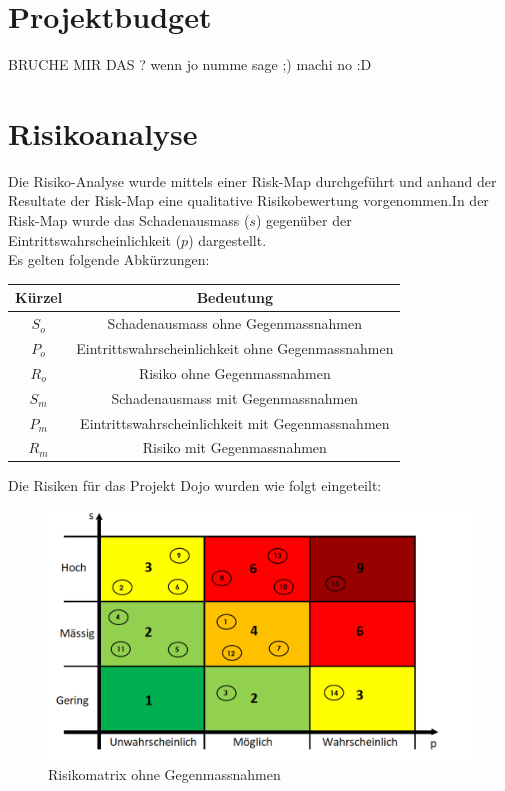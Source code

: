 \documentclass[10pt,a4paper,oneside]{99_fhnwreport}
\begin{document}
\section{Projektbudget}\label{sec:projektbudget}
BRUCHE MIR DAS ?
wenn jo numme sage ;) machi no :D
\section{Risikoanalyse}\label{sec:risikoanalyse}
Die Risiko-Analyse wurde mittels einer Risk-Map durchgeführt und anhand der Resultate der Risk-Map eine qualitative Risikobewertung vorgenommen.In der Risk-Map wurde das Schadenausmass ($s$) gegenüber der Eintrittswahrscheinlichkeit ($p$) dargestellt.\\ Es gelten folgende Abkürzungen: 

\begin{center}

	\begin{tabular}{|c|c|}
		\hline
		 \textbf{Kürzel} &  \textbf{Bedeutung} \\ \hline
		$S_{o}$ & Schadenausmass ohne Gegenmassnahmen \\ \hline
		$P_{o}$ & Eintrittswahrscheinlichkeit ohne Gegenmassnahmen \\ \hline
		$R_{o}$ & Risiko ohne Gegenmassnahmen \\ \hline
		$S_{m}$ & Schadenausmass mit Gegenmassnahmen \\ \hline
		$P_{m}$ & Eintrittswahrscheinlichkeit mit  Gegenmassnahmen \\ \hline
		$R_{m}$ & Risiko mit Gegenmassnahmen \\ \hline 
	\end{tabular}

\end{center}

Die Risiken für das Projekt Dojo wurden wie folgt eingeteilt:

\begin{figure}[htbp]
	\centering
	\includegraphics[width=13.5cm]{risiko1.png}
		\caption{Risikomatrix ohne Gegenmassnahmen}
\end{figure}
\end{document}
